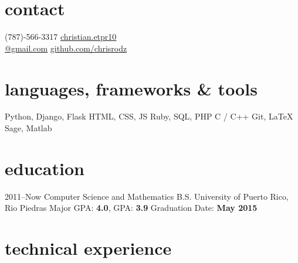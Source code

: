 \documentclass[]{friggeri-cv}
\begin{document}


\begin{aside} %
\section{contact}
(787)-566-3317
\href{mailto:christian.etpr10@gmail.com}{christian.etpr10 \\ @gmail.com}
\href{http://github.com/chrisrodz}{github.com/chrisrodz}
\section{languages, frameworks \& tools}
Python, Django, Flask
HTML, CSS, JS
Ruby, SQL, PHP
C / C++
Git, LaTeX
Sage, Matlab
\end{aside}


\section{education}

\begin{entrylist}
\entry
{2011--Now}
{Computer Science and Mathematics B.S.}
{University of Puerto Rico, Rio Piedras}
{Major GPA: \textbf{4.0}, GPA: \textbf{3.9} Graduation Date: \textbf{May 2015}}
\end{entrylist}


\section{technical experience}
\end{document}
